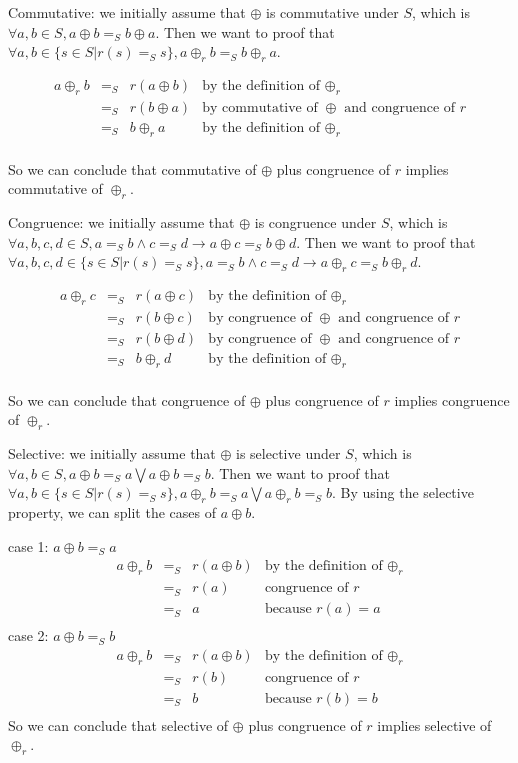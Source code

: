 \documentclass[a4paper,10pt]{article}
\newcommand{\e}[2]{
\begin{equation}
  \label{#1} 
  #2
\end{equation}
}
\begin{document}
Commutative: we initially assume that $\oplus$ is commutative under $S$, which is $\forall a,b \in S, a \oplus b =_S b \oplus a$. Then we want to proof that $\forall a,b \in \{s \in S | r(s) =_S s\}, a \oplus_r b =_S b \oplus_r a$.
\e{r:proof:commutative}{
\begin{array}{rcll} 
a \oplus_r b & =_S & r(a \oplus b) &\mbox{by the definition of $\oplus_r$} \\
			 & =_S & r(b \oplus a) &\mbox{by commutative of $\oplus$ and congruence of $r$}\\
             & =_S & b \oplus_r a &\mbox{by the definition of $\oplus_r$} \\
\end{array}}
So we can conclude that commutative of $\oplus$ plus congruence of $r$ implies commutative of $\oplus_r$.

Congruence: we initially assume that $\oplus$ is congruence under $S$, which is $\forall a,b,c,d \in S, a =_S b \wedge c =_S d \rightarrow a \oplus c =_S b \oplus d$. Then we want to proof that $\forall a,b,c,d \in \{s \in S | r(s) =_S s\}, a =_S b \wedge c =_S d \rightarrow a \oplus_r c =_S b \oplus_r d$.
\e{r:proof:congruence}{
\begin{array}{rcll} 
a \oplus_r c & =_S & r(a \oplus c) &\mbox{by the definition of $\oplus_r$} \\
			 & =_S & r(b \oplus c) &\mbox{by congruence of $\oplus$ and congruence of $r$}\\
			 & =_S & r(b \oplus d) &\mbox{by congruence of $\oplus$ and congruence of $r$}\\
             & =_S & b \oplus_r d &\mbox{by the definition of $\oplus_r$} \\
\end{array}}
So we can conclude that congruence of $\oplus$ plus congruence of $r$ implies congruence of $\oplus_r$.

Selective: we initially assume that $\oplus$ is selective under $S$, which is $\forall a,b \in S, a \oplus b =_S a \bigvee a \oplus b =_S b$. Then we want to proof that $\forall a,b \in \{s \in S | r(s) =_S s\}, a \oplus_r b =_S a \bigvee a \oplus_r b =_S b$. By using the selective property, we can split the cases of $a\oplus b$.

case 1: $a \oplus b =_S a$
\[
\begin{array}{rcll} 
a \oplus_r b & =_S & r(a \oplus b) &\mbox{by the definition of $\oplus_r$} \\
			 & =_S & r(a) &\mbox{congruence of $r$}\\
			 & =_S & a &\mbox{because $r(a) = a$}\\
\end{array}
\]
case 2: $a \oplus b =_S b$
\[
\begin{array}{rcll} 
a \oplus_r b & =_S & r(a \oplus b) &\mbox{by the definition of $\oplus_r$} \\
			 & =_S & r(b) &\mbox{congruence of $r$}\\
			 & =_S & b &\mbox{because $r(b) = b$}\\
\end{array}
\]
So we can conclude that selective of $\oplus$ plus congruence of $r$ implies selective of $\oplus_r$.
\end{document}
